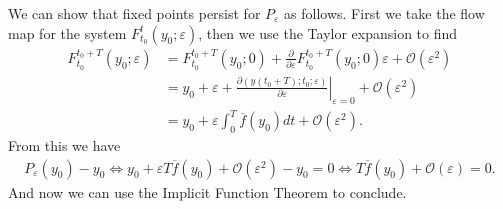 \begin{remark}[]
	We can show that fixed points persist for $P_\varepsilon$ as follows. First we take the flow map for the system $F_{t_0}^{t}(y_0;\varepsilon)$, then we use the Taylor expansion to find
	\begin{align}
		F_{t_0}^{t_0+T}(y_0; \varepsilon) &= F_{t_0}^{t_0+T}(y_0;0) + \frac{\partial}{\partial \varepsilon}F_{t_0}^{t_0 + T}(y_0;0)\varepsilon + \mathcal{O}(\varepsilon^2) \\
						  &= y_0 + \varepsilon + \left.\frac{\partial (y(t_0+T);t_0;\varepsilon)}{\partial \varepsilon} \right|_{\varepsilon=0} + \mathcal{O}(\varepsilon^2) \\
						  &= y_0 + \varepsilon \int_{0}^{T} \overline{f}(y_0)dt + \mathcal{O}(\varepsilon^2) .
	\end{align}
From this we have
\begin{align}
	P_{\varepsilon}(y_0) - y_0 \Leftrightarrow y_0 +\varepsilon T \overline{f}(y_0) + \mathcal{O}(\varepsilon^2) - y_0=0 \Leftrightarrow  T \overline{f}(y_0) + \mathcal{O}(\varepsilon) = 0.
\end{align}
And now we can use the Implicit Function Theorem to conclude.
\end{remark}

